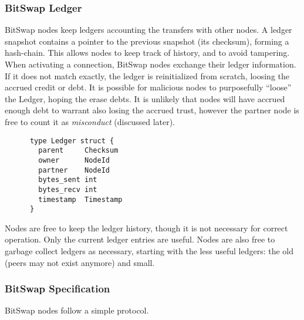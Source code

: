 \documentclass{sig-alternate}
\begin{document}

\subsubsection{BitSwap Ledger}

BitSwap nodes keep ledgers accounting the transfers with other nodes.
A ledger snapshot contains a pointer to the previous snapshot (its checksum),
forming a hash-chain. This allows nodes to keep track of history, and to avoid
tampering. When activating a connection, BitSwap nodes exchange their ledger
information.
If it does not match exactly, the ledger is reinitialized from scratch,
loosing the accrued credit or debt.  It is possible for malicious nodes to
purposefully ``loose'' the Ledger, hoping the erase debts. It is unlikely that
nodes will have accrued enough debt to warrant also losing the accrued trust,
however the partner node is free to count it as \textit{misconduct} (discussed
later).

\begin{verbatim}
      type Ledger struct {
        parent     Checksum
        owner      NodeId
        partner    NodeId
        bytes_sent int
        bytes_recv int
        timestamp  Timestamp
      }
\end{verbatim}

Nodes are free to keep the ledger history, though it is not necessary for
correct operation. Only the current ledger entries are useful. Nodes are
also free to garbage collect ledgers as necessary, starting with the less
useful ledgers: the old (peers may not exist anymore) and small.

\subsubsection{BitSwap Specification}

BitSwap nodes follow a simple protocol.
\end{document}

